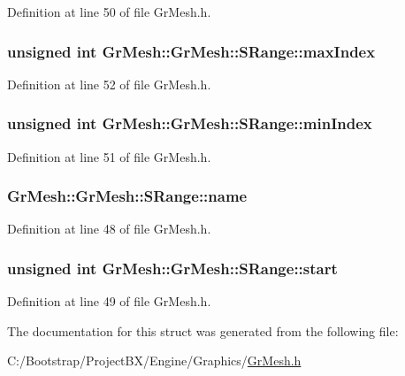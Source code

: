 Definition at line 50 of file GrMesh.h.\hypertarget{struct_gr_mesh_1_1_s_range_7e44b7370e15a3faaea7669107d2f4cd}{
\subsubsection[{maxIndex}]{\setlength{\rightskip}{0pt plus 5cm}unsigned int GrMesh::GrMesh::SRange::maxIndex}}
\label{struct_gr_mesh_1_1_s_range_7e44b7370e15a3faaea7669107d2f4cd}




Definition at line 52 of file GrMesh.h.\hypertarget{struct_gr_mesh_1_1_s_range_63e71ca2a50a27fa4c6b95ebfd7472f4}{
\subsubsection[{minIndex}]{\setlength{\rightskip}{0pt plus 5cm}unsigned int GrMesh::GrMesh::SRange::minIndex}}
\label{struct_gr_mesh_1_1_s_range_63e71ca2a50a27fa4c6b95ebfd7472f4}




Definition at line 51 of file GrMesh.h.\hypertarget{struct_gr_mesh_1_1_s_range_332525f7e1ef670c14bd59cd8b47a34f}{
\subsubsection[{name}]{ {\bf GrMesh::GrMesh::SRange::name}}}
\label{struct_gr_mesh_1_1_s_range_332525f7e1ef670c14bd59cd8b47a34f}




Definition at line 48 of file GrMesh.h.\hypertarget{struct_gr_mesh_1_1_s_range_baaa840da5e956fb1b9c1750a0c8928f}{
\subsubsection[{start}]{\setlength{\rightskip}{0pt plus 5cm}unsigned int {\bf GrMesh::GrMesh::SRange::start}}}
\label{struct_gr_mesh_1_1_s_range_baaa840da5e956fb1b9c1750a0c8928f}




Definition at line 49 of file GrMesh.h.

The documentation for this struct was generated from the following file:\begin{CompactItemize}
\item 
C:/Bootstrap/ProjectBX/Engine/Graphics/\hyperlink{_gr_mesh_8h}{GrMesh.h}\end{CompactItemize}
